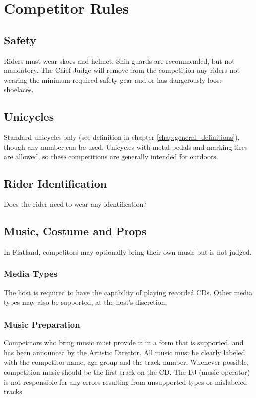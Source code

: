 \chapter{Competitor Rules}

\section{Safety}

Riders must wear shoes and helmet.
Shin guards are recommended, but not mandatory.
The Chief Judge will remove from the competition any riders not wearing the minimum required safety gear and or has dangerously loose shoelaces.

\section{Unicycles}

Standard unicycles only (see definition in chapter \ref{chap:general_definitions}), though any number can be used.
Unicycles with metal pedals and marking tires are allowed, so these competitions are generally intended for outdoors.

\section{Rider Identification}

\begin{framed}
Does the rider need to wear any identification?
\end{framed}

\section{Music, Costume and Props}
In Flatland, competitors may optionally bring their own music but is not judged.

\subsection{Media Types}
The host is required to have the capability of playing recorded CDs.
Other media types may also be supported, at the host's discretion.

\subsection{Music Preparation}
Competitors who bring music must provide it in a form that is supported, and has been announced by the Artistic Director.
All music must be clearly labeled with the competitor name, age group and the track number.
Whenever possible, competition music should be the first track on the CD.
The DJ (music operator) is not responsible for any errors resulting from unsupported types or mislabeled tracks.

